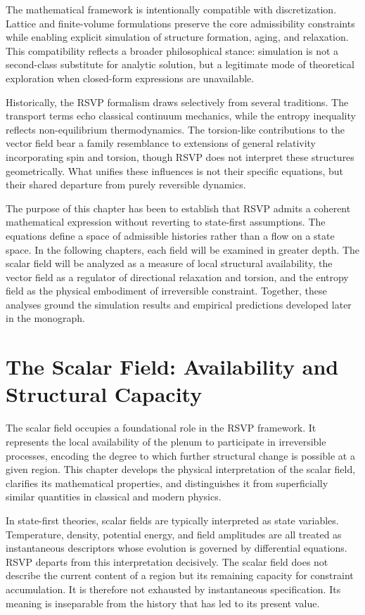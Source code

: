 \documentclass[11pt,oneside]{book}
\begin{document}
The mathematical framework is intentionally compatible with discretization. Lattice and finite-volume formulations preserve the core admissibility constraints while enabling explicit simulation of structure formation, aging, and relaxation. This compatibility reflects a broader philosophical stance: simulation is not a second-class substitute for analytic solution, but a legitimate mode of theoretical exploration when closed-form expressions are unavailable.

Historically, the RSVP formalism draws selectively from several traditions. The transport terms echo classical continuum mechanics, while the entropy inequality reflects non-equilibrium thermodynamics. The torsion-like contributions to the vector field bear a family resemblance to extensions of general relativity incorporating spin and torsion, though RSVP does not interpret these structures geometrically. What unifies these influences is not their specific equations, but their shared departure from purely reversible dynamics.

The purpose of this chapter has been to establish that RSVP admits a coherent mathematical expression without reverting to state-first assumptions. The equations define a space of admissible histories rather than a flow on a state space. In the following chapters, each field will be examined in greater depth. The scalar field will be analyzed as a measure of local structural availability, the vector field as a regulator of directional relaxation and torsion, and the entropy field as the physical embodiment of irreversible constraint. Together, these analyses ground the simulation results and empirical predictions developed later in the monograph.

\chapter{The Scalar Field: Availability and Structural Capacity}

The scalar field occupies a foundational role in the RSVP framework. It represents the local availability of the plenum to participate in irreversible processes, encoding the degree to which further structural change is possible at a given region. This chapter develops the physical interpretation of the scalar field, clarifies its mathematical properties, and distinguishes it from superficially similar quantities in classical and modern physics.

In state-first theories, scalar fields are typically interpreted as state variables. Temperature, density, potential energy, and field amplitudes are all treated as instantaneous descriptors whose evolution is governed by differential equations. RSVP departs from this interpretation decisively. The scalar field does not describe the current content of a region but its remaining capacity for constraint accumulation. It is therefore not exhausted by instantaneous specification. Its meaning is inseparable from the history that has led to its present value.
\end{document}
